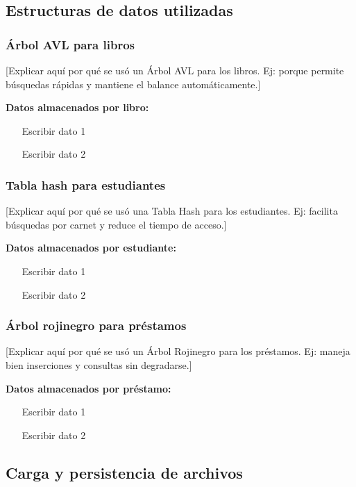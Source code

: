 \documentclass[11pt]{article}
\begin{document}
\subsection{Estructuras de datos utilizadas}

\subsubsection{Árbol AVL para libros}

[Explicar aquí por qué se usó un Árbol AVL para los libros. Ej: porque permite búsquedas rápidas y mantiene el balance automáticamente.]

\textbf{Datos almacenados por libro:}
\begin{itemize}[noitemsep]
    \item [Escribir dato 1]
    \item [Escribir dato 2]
\end{itemize}

\subsubsection{Tabla hash para estudiantes}

[Explicar aquí por qué se usó una Tabla Hash para los estudiantes. Ej: facilita búsquedas por carnet y reduce el tiempo de acceso.]

\textbf{Datos almacenados por estudiante:}
\begin{itemize}[noitemsep]
    \item [Escribir dato 1]
    \item [Escribir dato 2]
\end{itemize}

\subsubsection{Árbol rojinegro para préstamos}

[Explicar aquí por qué se usó un Árbol Rojinegro para los préstamos. Ej: maneja bien inserciones y consultas sin degradarse.]

\textbf{Datos almacenados por préstamo:}
\begin{itemize}[noitemsep]
    \item [Escribir dato 1]
    \item [Escribir dato 2]
\end{itemize}

\subsection{Carga y persistencia de archivos}
\end{document}
